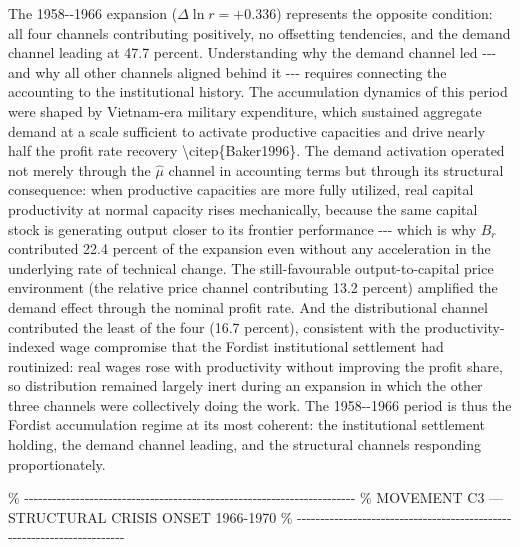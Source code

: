 The 1958-\/-1966 expansion (\(\Delta\ln r = +0.336\)) represents the
opposite condition: all four channels contributing positively, no
offsetting tendencies, and the demand channel leading at 47.7 percent.
Understanding why the demand channel led -\/-\/- and why all other
channels aligned behind it -\/-\/- requires connecting the accounting to
the institutional history. The accumulation dynamics of this period were
shaped by Vietnam-era military expenditure, which sustained aggregate
demand at a scale sufficient to activate productive capacities and drive
nearly half the profit rate recovery \textbackslash citep\{Baker1996\}.
The demand activation operated not merely through the \(\hat{\mu}\)
channel in accounting terms but through its structural consequence: when
productive capacities are more fully utilized, real capital productivity
at normal capacity rises mechanically, because the same capital stock is
generating output closer to its frontier performance -\/-\/- which is
why \(B_{r}\) contributed 22.4 percent of the expansion even without any
acceleration in the underlying rate of technical change. The
still-favourable output-to-capital price environment (the relative price
channel contributing 13.2 percent) amplified the demand effect through
the nominal profit rate. And the distributional channel contributed the
least of the four (16.7 percent), consistent with the
productivity-indexed wage compromise that the Fordist institutional
settlement had routinized: real wages rose with productivity without
improving the profit share, so distribution remained largely inert
during an expansion in which the other three channels were collectively
doing the work. The 1958-\/-1966 period is thus the Fordist accumulation
regime at its most coherent: the institutional settlement holding, the
demand channel leading, and the structural channels responding
proportionately.

\%
-\/-\/-\/-\/-\/-\/-\/-\/-\/-\/-\/-\/-\/-\/-\/-\/-\/-\/-\/-\/-\/-\/-\/-\/-\/-\/-\/-\/-\/-\/-\/-\/-\/-\/-\/-\/-\/-\/-\/-\/-\/-\/-\/-\/-\/-\/-\/-\/-\/-\/-\/-\/-\/-\/-\/-\/-\/-\/-\/-\/-\/-\/-\/-\/-\/-\/-\/-\/-\/-\/-
\% MOVEMENT C3 --- STRUCTURAL CRISIS ONSET 1966-1970 \%
-\/-\/-\/-\/-\/-\/-\/-\/-\/-\/-\/-\/-\/-\/-\/-\/-\/-\/-\/-\/-\/-\/-\/-\/-\/-\/-\/-\/-\/-\/-\/-\/-\/-\/-\/-\/-\/-\/-\/-\/-\/-\/-\/-\/-\/-\/-\/-\/-\/-\/-\/-\/-\/-\/-\/-\/-\/-\/-\/-\/-\/-\/-\/-\/-\/-\/-\/-\/-\/-\/-


